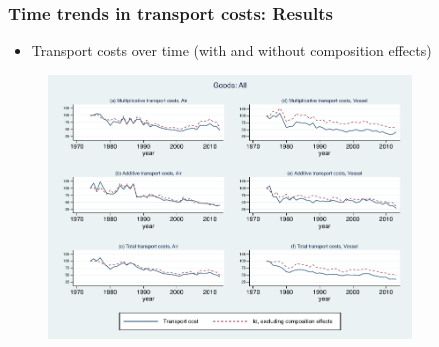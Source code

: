 \documentclass[10 pt,Helvetica, french]{beamer}
\begin{document}
\begin{frame}[label = slide_compeffects_figure]
\frametitle{Time trends in transport costs: Results}
\begin{itemize}
\item Transport costs over time (with and without composition effects)
\end{itemize}

\begin{figure}[htbp]
\begin{center}
\includegraphics[height=7cm]
{graph_composition_all.pdf}
\end{center}
\end{figure}
\hyperlink{slide_compeffects_results}{}
\end{frame}
\end{document}
